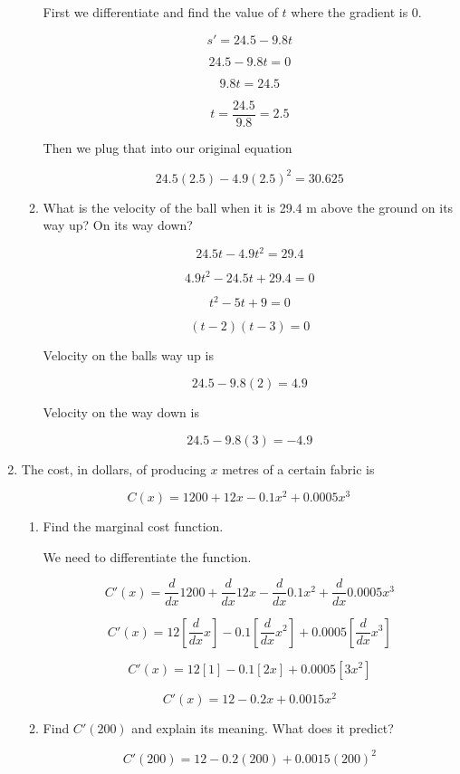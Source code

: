 \documentclass{article}
\begin{document}
\begin{enumerate}
\begin{enumerate}
						First we differentiate and find the value of $t$ where the
						gradient is 0.

						$$s' = 24.5 - 9.8t$$

						$$24.5 - 9.8t = 0$$

						$$9.8t = 24.5$$

						$$t = \frac{24.5}{9.8} = 2.5$$

						Then we plug that into our original equation

						$$24.5(2.5) - 4.9(2.5)^2 = 30.625$$

					\item What is the velocity of the ball when it is 29.4 m above
						the ground on its way up? On its way down?

						$$24.5t - 4.9t^2 = 29.4$$

						$$4.9t^2 - 24.5t + 29.4 = 0$$

						$$t^2 - 5t + 9 = 0$$

						$$(t-2)(t-3) = 0$$

						Velocity on the balls way up is

						$$24.5 - 9.8(2) = 4.9$$

						Velocity on the way down is

						$$24.5 - 9.8(3) = -4.9$$
				\end{enumerate}
					
			\item The cost, in dollars, of producing $x$ metres of a certain fabric
				is 

				$$C(x) = 1200 + 12x - 0.1x^2 + 0.0005x^3$$

			\begin{enumerate}
				\item Find the marginal cost function.

					We need to differentiate the function.

					$$C'(x) = \frac{d}{dx} 1200 + \frac{d}{dx} 12x - \frac{d}{dx} 0.1x^2 + \frac{d}{dx} 0.0005x^3$$

					$$C'(x) = 12[\frac{d}{dx} x] - 0.1[\frac{d}{dx}x^2] + 0.0005[\frac{d}{dx} x^3]$$

					$$C'(x) = 12[1] - 0.1[2x] + 0.0005[3x^2]$$

					$$C'(x) = 12 - 0.2x + 0.0015x^2$$

				\item Find $C'(200)$ and explain its meaning. What does it predict?

					$$C'(200) = 12 - 0.2(200) + 0.0015(200)^2$$


\end{enumerate}
\end{enumerate}
\end{document}
